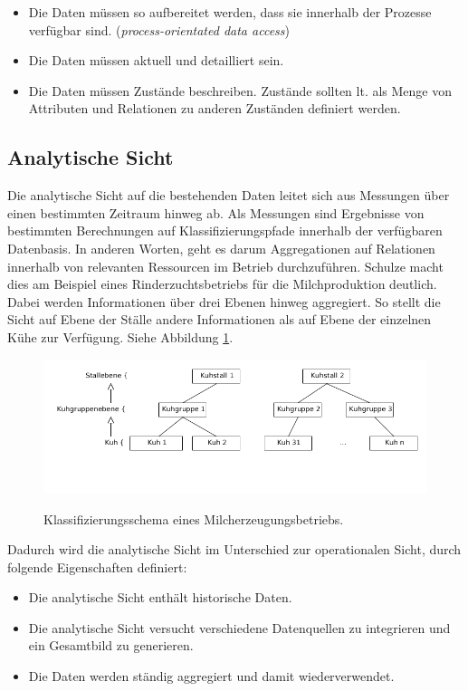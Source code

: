 \begin{itemize}
	\item Die Daten müssen so aufbereitet werden, dass sie innerhalb der Prozesse verfügbar sind. (\textit{process-orientated data access})
	\item Die Daten müssen aktuell und detailliert sein.
	\item Die Daten müssen Zustände beschreiben. Zustände sollten lt. \cite{jour:Schulze2007} als Menge von Attributen und Relationen zu anderen Zuständen definiert werden.
\end{itemize}

\subsection{Analytische Sicht}
Die analytische Sicht auf die bestehenden Daten leitet sich aus Messungen über einen bestimmten Zeitraum hinweg ab. Als Messungen sind Ergebnisse von bestimmten Berechnungen auf Klassifizierungspfade innerhalb der verfügbaren Datenbasis. In anderen Worten, geht es darum Aggregationen auf Relationen innerhalb von relevanten Ressourcen im Betrieb durchzuführen. Schulze macht dies am Beispiel eines Rinderzuchtsbetriebs für die Milchproduktion deutlich. Dabei werden Informationen über drei Ebenen hinweg aggregiert. So stellt die Sicht auf Ebene der Ställe andere Informationen als auf Ebene der einzelnen Kühe zur Verfügung. Siehe Abbildung \ref{fig:kuehe}. 

\begin{figure}[h]
 \includegraphics[scale=0.5,natwidth=\textwidth]{figures/datamodelling/kuehe.png}
 \centering
 \label{fig:kuehe}
 \caption{Klassifizierungsschema eines Milcherzeugungsbetriebs.}
\end{figure}

Dadurch wird die analytische Sicht im Unterschied zur operationalen Sicht, durch folgende Eigenschaften definiert:
\begin{itemize}
	\item Die analytische Sicht enthält historische Daten.
	\item Die analytische Sicht versucht verschiedene Datenquellen zu integrieren und ein Gesamtbild zu generieren.
	\item Die Daten werden ständig aggregiert und damit wiederverwendet.
\end{itemize}

